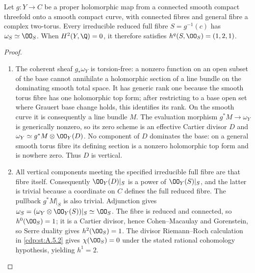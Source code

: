\begin{proposition}\hypertarget{tag-01AT}{}\label{cdp:st:A.4.4}

Let $g:Y\to C$ be a proper holomorphic map from a connected smooth compact threefold onto a smooth compact curve, with connected fibres and general fibre a complex two-torus. Every irreducible reduced full fibre $S=g^{-1}(c)$ has $\omega_S\simeq\OO_S$. When $H^2(Y,\Q)=0$, it therefore satisfies $h^q(S,\OO_S)=(1,2,1)$.
\end{proposition}


\begin{proof}

\begin{enumerate}[label={$\langle1\rangle$\arabic*.},leftmargin=*]
\item The coherent sheaf $g_*\omega_Y$ is torsion-free: a nonzero function on an open subset of the base cannot annihilate a holomorphic section of a line bundle on the dominating smooth total space. It has generic rank one because the smooth torus fibre has one holomorphic top form; after restricting to a base open set where Grauert base change holds, this identifies its rank. On the smooth curve it is consequently a line bundle $M$. The evaluation morphism $g^*M\to\omega_Y$ is generically nonzero, so its zero scheme is an effective Cartier divisor $D$ and $\omega_Y\simeq g^*M\otimes\OO_Y(D)$. No component of $D$ dominates the base: on a general smooth torus fibre its defining section is a nonzero holomorphic top form and is nowhere zero. Thus $D$ is vertical.

\item All vertical components meeting the specified irreducible full fibre are that fibre itself. Consequently $\OO_Y(D)|_S$ is a power of $\OO_Y(S)|_S$, and the latter is trivial because a coordinate on $C$ defines the full reduced fibre. The pullback $g^*M|_S$ is also trivial. Adjunction gives $\omega_S=(\omega_Y\otimes\OO_Y(S))|_S\simeq\OO_S$. The fibre is reduced and connected, so $h^0(\OO_S)=1$; it is a Cartier divisor, hence Cohen--Macaulay and Gorenstein, so Serre duality gives $h^2(\OO_S)=1$. The divisor Riemann--Roch calculation in \ref{cdp:st:A.5.2} gives $\chi(\OO_S)=0$ under the stated rational cohomology hypothesis, yielding $h^1=2$.

\end{enumerate}
\end{proof}